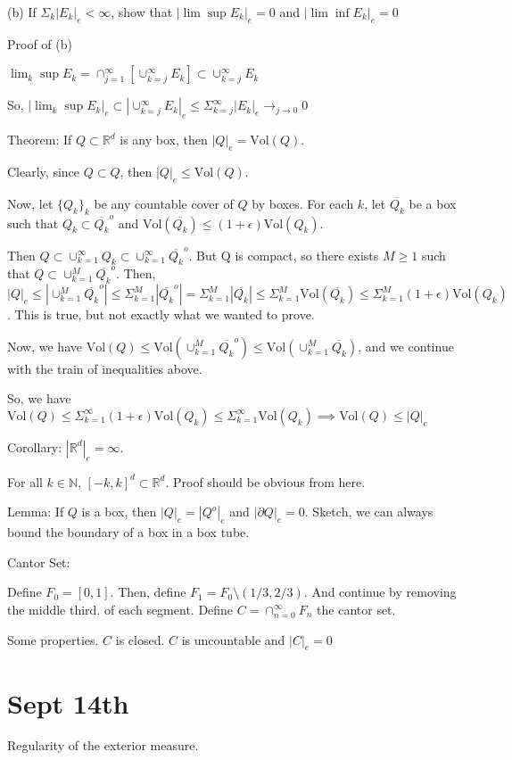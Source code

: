 \documentclass[10pt]{article}
\newcommand{\vol}{\text{Vol}}
\begin{document}
(b) If $\Sigma_k |E_k|_e < \infty$, show that $|\lim \sup E_k | _e = 0$ and $|\lim \inf E_k | _e = 0$

Proof of (b)

$\lim_k \sup E_k = \cap_{j=1}^\infty [ \cup_{k=j}^\infty E_k ] \subset \cup_{k=j}^\infty E_k$

So, $| \lim_k \sup E_k|_e \subset |\cup_{k=j}^\infty E_k|_e \leq \Sigma_{k=j}^\infty |E_k|_e \rightarrow_{j\rightarrow0} 0$

Theorem: If $Q \subset \mathbb{R}^d$ is any box, then $|Q|_e = \vol(Q)$.

Clearly, since $Q \subset Q$, then $|Q|_e \leq \vol(Q)$.

Now, let $\{Q_k\}_k$ be any countable cover of $Q$ by boxes. For each $k$, let $\overline{Q_k}$ be a box such that $Q_k \subset \overline{Q_k}^o$ and $\vol(\overline{Q_k}) \leq (1 + \epsilon) \vol(Q_k)$.

Then $Q \subset \cup_{k=1}^\infty Q_k \subset \cup_{k=1}^\infty \overline{Q_k}^o$. But Q is compact, so there exists $M \geq 1$ such that $Q \subset \cup_{k=1}^M  \overline{Q_k}^o$. Then, $|Q|_e \leq |\cup_{k=1}^M  \overline{Q_k}^o |\leq \Sigma_{k=1}^M |\overline{Q_k}^o| = \Sigma_{k=1}^M |\overline{Q_k}| \leq \Sigma_{k=1}^M \vol(\overline{Q_k}) \leq   \Sigma_{k=1}^M(1 + \epsilon) \vol(Q_k)$. This is true, but not exactly what we wanted to prove.

Now, we have $\vol(Q) \leq \vol(\cup_{k=1}^M \overline{Q_k}^o) \leq \vol(\cup_{k=1}^M \overline{Q_k})$, and we continue with the train of inequalities above.

So, we have $\vol(Q) \leq \Sigma_{k=1}^\infty(1 + \epsilon) \vol(Q_k) \leq \Sigma_{k=1}^\infty\vol(Q_k) \implies \vol(Q) \leq |Q|_e$

Corollary: $|\mathbb{R}^d|_e = \infty$.

For all $k \in \mathbb{N}$, $[-k,k]^d \subset \mathbb{R}^d$. Proof should be obvious from here.

Lemma: If $Q$ is a box, then $|Q|_e = |Q^o|_e$ and $|\partial Q|_e = 0$. Sketch, we can always bound the boundary of a box in a box tube.

Cantor Set: 

Define $F_0 = [0,1]$. Then, define $F_1 = F_0 \setminus (1/3,2/3)$. And continue by removing the middle third. of each segment. Define $C = \cap_{n=0}^\infty F_n$ the cantor set.

Some properties. $C$ is closed. $C$ is uncountable and $|C|_e = 0$

\section*{Sept 14th}
Regularity of the exterior measure. 
\end{document}
